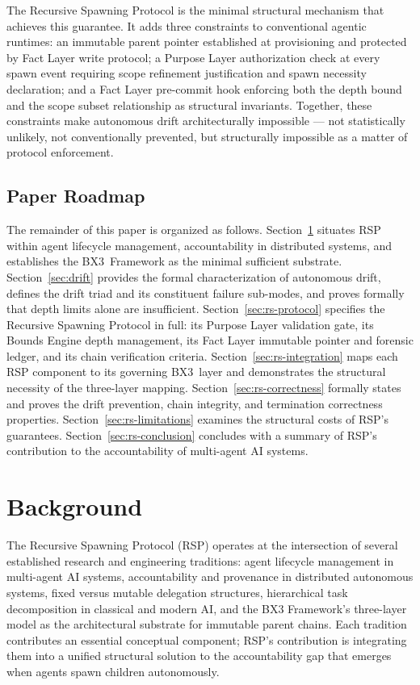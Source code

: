 \documentclass[12pt]{article}
\def\bxthree{BX3}
\begin{document}
The Recursive Spawning Protocol is the minimal structural mechanism that achieves this guarantee. It adds three constraints to conventional agentic runtimes: an immutable parent pointer established at provisioning and protected by Fact Layer write protocol; a Purpose Layer authorization check at every spawn event requiring scope refinement justification and spawn necessity declaration; and a Fact Layer pre-commit hook enforcing both the depth bound and the scope subset relationship as structural invariants. Together, these constraints make autonomous drift architecturally impossible --- not statistically unlikely, not conventionally prevented, but structurally impossible as a matter of protocol enforcement.

\subsection{Paper Roadmap}

The remainder of this paper is organized as follows. Section~\ref{sec:rs-background} situates RSP within agent lifecycle management, accountability in distributed systems, and establishes the \bxthree\ Framework as the minimal sufficient substrate. Section~\ref{sec:drift} provides the formal characterization of autonomous drift, defines the drift triad and its constituent failure sub-modes, and proves formally that depth limits alone are insufficient. Section~\ref{sec:rs-protocol} specifies the Recursive Spawning Protocol in full: its Purpose Layer validation gate, its Bounds Engine depth management, its Fact Layer immutable pointer and forensic ledger, and its chain verification criteria. Section~\ref{sec:rs-integration} maps each RSP component to its governing \bxthree\ layer and demonstrates the structural necessity of the three-layer mapping. Section~\ref{sec:rs-correctness} formally states and proves the drift prevention, chain integrity, and termination correctness properties. Section~\ref{sec:rs-limitations} examines the structural costs of RSP's guarantees. Section~\ref{sec:rs-conclusion} concludes with a summary of RSP's contribution to the accountability of multi-agent AI systems.
\section{Background}
\label{sec:rs-background}

The Recursive Spawning Protocol (RSP) operates at the intersection of several established research and engineering traditions: agent lifecycle management in multi-agent AI systems, accountability and provenance in distributed autonomous systems, fixed versus mutable delegation structures, hierarchical task decomposition in classical and modern AI, and the BX3 Framework's three-layer model as the architectural substrate for immutable parent chains. Each tradition contributes an essential conceptual component; RSP's contribution is integrating them into a unified structural solution to the accountability gap that emerges when agents spawn children autonomously.
\end{document}
